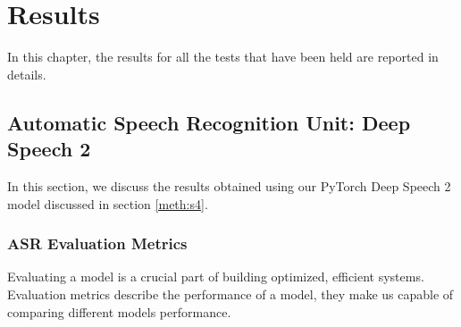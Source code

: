 \chapter{Results}
\label{chap:results}

\newenvironment{conditions}
{\par\vspace{\abovedisplayskip}\noindent\begin{tabular}{>{$}l<{$} @{${}={}$} l}}
	{\end{tabular}\par\vspace{\belowdisplayskip}}

In this chapter, the results for all the tests that have been held are reported in details.

\section{Automatic Speech Recognition Unit: Deep Speech 2}
\label{res:s1}

In this section, we discuss the results obtained using our PyTorch Deep Speech 2 model discussed in section \ref{meth:s4}. 

\subsection{ASR Evaluation Metrics}
\label{res:s1_sub1}

Evaluating a model is a crucial part of building optimized, efficient systems. Evaluation metrics describe the performance of a model, they make us capable of comparing different models performance.

